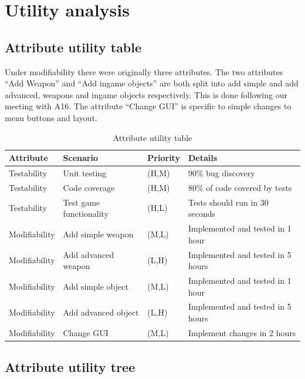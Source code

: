 \pagebreak
\section{Utility analysis}

\subsection{Attribute utility table}
Under modifiability there were originally three attributes. The two attributes “Add Weapon” and “Add ingame objects” are both split into add simple and add advanced, weapons and ingame objects respectively. This is done following our meeting with A16. The attribute “Change GUI” is specific to simple changes to menu buttons and layout.

\begin{table}[H]
\small
\begin{tabular}{| p{} | p{} | p{} | p{} |} \hline
{\bf Attribute} & {\bf Scenario} & {\bf Priority} & {\bf Details} \\ \hline
Testability & Unit testing & (H,M) & 90\% bug discovery \\ \hline
Testability & Code coverage & (H,M) & 80\% of code covered by tests \\ \hline
Testability & Test game functionality & (H,L) & Tests should run in 30 seconds \\ \hline
Modifiability & Add simple weapon & (M,L) & Implemented and tested in 1 hour \\ \hline
Modifiability & Add advanced weapon & (L,H) & Implemented and tested in 5 hours \\ \hline
Modifiability & Add simple object & (M,L) & Implemented and tested in 1 hour \\ \hline
Modifiability & Add advanced object & (L,H) & Implemented and tested in 5 hours \\ \hline
Modifiability & Change GUI & (M,L) & Implement changes in 2 hours \\ \hline
\end{tabular}
\caption{Attribute utility table}
\end{table}

\normalsize

\pagebreak
\subsection{Attribute utility tree}

